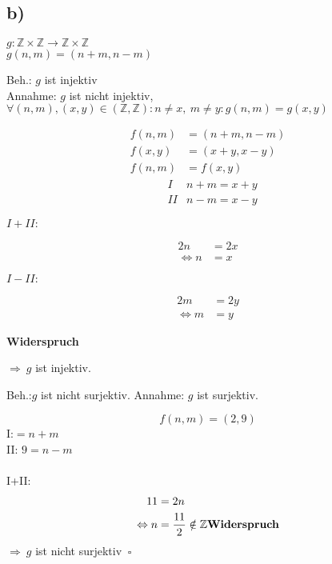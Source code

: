 \documentclass[a4paper]{scrartcl}
\newcommand{\qed}{\ \square}
\begin{document}
\subsection{b)}
	\(g: \mathbb{Z}\times\mathbb{Z}\rightarrow\mathbb{Z}\times\mathbb{Z}\)\\
	\(g(n,m)=(n+m,n-m)\)\\
	\begin{flushleft}
		Beh.: \(g\) ist injektiv\\
		Annahme: \(g\) ist nicht injektiv,\\
		\(\forall(n,m),(x,y)\in(\mathbb{Z},\mathbb{Z}):n\neq x,\ m\neq y :g(n,m)=g(x,y)\)
	\end{flushleft}
	\begin{align}
		f(n,m)&=(n+m, n-m)\\
		f(x,y)&=(x+y, x-y)\\
		f(n,m)&=f(x,y)
	\end{align}
	\begin{align}
		&I    &n+m=x+y\\
		&II   &n-m=x-y
	\end{align}
	\begin{center}
		\(I+II:\)	
	\end{center}
	\begin{align}
		2n&=2x\\
		\Leftrightarrow n&=x
	\end{align}
	\begin{center}
		\(I-II:\)
	\end{center}
	\begin{align}
		2m&=2y\\
		\Leftrightarrow m&=y
	\end{align}
	\begin{center}
		\textbf{Widerspruch}
	\end{center}
	\(\Rightarrow\ g\) ist injektiv.
	
	\begin{flushleft}
		Beh.:\(g\) ist nicht surjektiv.
		Annahme: \(g\) ist surjektiv.
	\end{flushleft}	
	\[f(n,m)=(2,9)\]
	I:\(=n+m\)\\
	II:	\(9=n-m\)\\	
	\\
	I+II:
	\begin{align}
		11&=2n\\
		\Leftrightarrow n&=\frac{11}{2} \notin \mathbb{Z} \text{\textbf{Widerspruch}}
	\end{align}
	\(\Rightarrow\ g\) ist nicht surjektiv \(\qed\)
\end{document}
